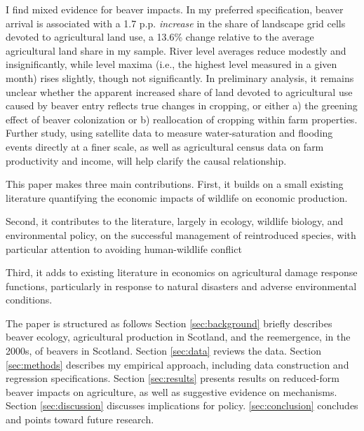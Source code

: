 I find mixed evidence for beaver impacts. In my preferred specification, beaver arrival is associated with a 1.7 p.p. \textit{increase} in the share of landscape grid cells devoted to agricultural land use, a 13.6\% change relative to the average agricultural land share in my sample. River level averages reduce modestly and insignificantly, while level maxima (i.e., the highest level measured in a given month) rises slightly, though not significantly. In preliminary analysis, it remains unclear whether the apparent increased share of land devoted to agricultural use caused by beaver entry reflects true changes in cropping, or either a) the greening effect of beaver colonization or b) reallocation of cropping within farm properties. Further study, using satellite data to measure water-saturation and flooding events directly at a finer scale, as well as agricultural census data on farm productivity and income, will help clarify the causal relationship.

This paper makes three main contributions. First, it builds on a small existing literature quantifying the economic impacts of wildlife on economic production.

Second, it contributes to the literature, largely in ecology, wildlife biology, and environmental policy, on the successful management of reintroduced species, with particular attention to avoiding human-wildlife conflict

Third, it adds to existing literature in economics on agricultural damage response functions, particularly in response to natural disasters and adverse environmental conditions.

The paper is structured as follows Section \ref{sec:background} briefly describes beaver ecology, agricultural production in Scotland, and the reemergence, in the 2000s, of beavers in Scotland. Section \ref{sec:data} reviews the data. Section \ref{sec:methods} describes my empirical approach, including data construction and regression specifications. Section \ref{sec:results} presents results on reduced-form beaver impacts on agriculture, as well as suggestive evidence on mechanisms. Section \ref{sec:discussion} discusses implications for policy. \ref{sec:conclusion} concludes and points toward future research. 



